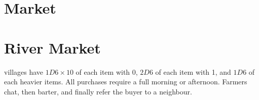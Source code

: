 \ifodd\value{diceNo}
  \section*{ Market}
\else
  \section*{River  Market}
\fi
\hint{\showCycle}

\ifodd\value{r3}
  \togglefalse{marketBeasts}
\else
  \toggletrue{marketBeasts}
\fi

\noindent
\Glspl{village} have $1D6\times 10$ of each item with  0, $2D6$ of each item with  1, and $1D6$ of each heavier items.
All purchases require a full morning or afternoon.
Farmers chat, then barter, and finally refer the buyer to a neighbour.

